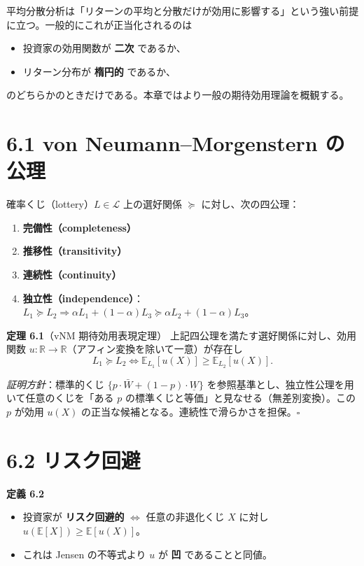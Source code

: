 \documentclass[11pt,a4paper]{report}
\begin{document}
平均分散分析は「リターンの平均と分散だけが効用に影響する」という強い前提に立つ。一般的にこれが正当化されるのは

\begin{itemize}
\item 投資家の効用関数が \textbf{二次} であるか、
\item リターン分布が \textbf{楕円的} であるか、
\end{itemize}

のどちらかのときだけである。本章ではより一般の期待効用理論を概観する。

\section{6.1 von Neumann–Morgenstern の公理}

確率くじ（lottery）$L \in \mathcal{L}$ 上の選好関係 $\succeq$ に対し、次の四公理：

\begin{enumerate}
\item \textbf{完備性（completeness）}
\item \textbf{推移性（transitivity）}
\item \textbf{連続性（continuity）}
\item \textbf{独立性（independence）}：$L_1 \succeq L_2 \Rightarrow \alpha L_1 + (1-\alpha) L_3 \succeq \alpha L_2 + (1-\alpha) L_3$。
\end{enumerate}

\textbf{定理 6.1}（vNM 期待効用表現定理） 上記四公理を満たす選好関係に対し、効用関数 $u: \mathbb{R} \to \mathbb{R}$（アフィン変換を除いて一意）が存在し \[ L_1 \succeq L_2 \iff \mathbb{E}_{L_1}[u(X)] \ge \mathbb{E}_{L_2}[u(X)]. \]

\emph{証明方針}：標準的くじ $\{p \cdot \bar W + (1-p) \cdot \underline W\}$ を参照基準とし、独立性公理を用いて任意のくじを「ある $p$ の標準くじと等価」と見なせる（無差別変換）。この $p$ が効用 $u(X)$ の正当な候補となる。連続性で滑らかさを担保。$\square$

\section{6.2 リスク回避}

\textbf{定義 6.2}
\begin{itemize}
\item 投資家が \textbf{リスク回避的} $\iff$ 任意の非退化くじ $X$ に対し $u(\mathbb{E}[X]) \ge \mathbb{E}[u(X)]$。
\item これは Jensen の不等式より $u$ が \textbf{凹} であることと同値。
\end{itemize}
\end{document}
